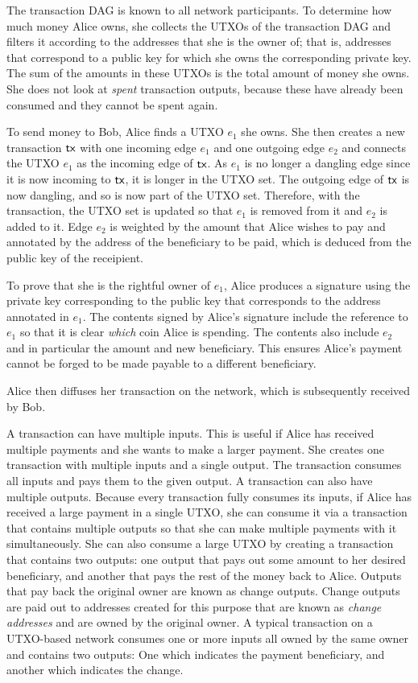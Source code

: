 The transaction DAG is known to all network participants. To determine how much
money Alice owns, she collects the UTXOs of the transaction DAG and filters it
according to the addresses that she is the owner of; that is, addresses that
correspond to a public key for which she owns the corresponding private key. The
sum of the amounts in these UTXOs is the total amount of money she owns. She
does not look at \emph{spent} transaction outputs, because these have already
been consumed and they cannot be spent again.

To send money to Bob, Alice finds a UTXO $e_1$ she owns. She then creates a new
transaction $\mathsf{tx}$ with one incoming edge $e_1$ and one outgoing edge $e_2$ and
connects the UTXO $e_1$ as the incoming edge of $\mathsf{tx}$. As $e_1$ is no longer
a dangling edge since it is now incoming to $\mathsf{tx}$, it is longer in the UTXO set.
The outgoing edge of $\mathsf{tx}$ is now dangling, and so is now part of the UTXO set.
Therefore, with the transaction, the UTXO set is updated so that $e_1$ is
removed from it and $e_2$ is added to it. Edge $e_2$ is weighted by the amount
that Alice wishes to pay and annotated by the address of the beneficiary to be
paid, which is deduced from the public key of the receipient.

To prove that she is the rightful owner of $e_1$, Alice produces a signature
using the private key corresponding to the public key that corresponds to the
address annotated in $e_1$. The contents signed by Alice's signature include the
reference to $e_1$ so that it is clear \emph{which} coin Alice is spending. The
contents also include $e_2$ and in particular the amount and new beneficiary.
This ensures Alice's payment cannot be forged to be made payable to a different
beneficiary.

Alice then diffuses her transaction on the network, which is subsequently
received by Bob.

A transaction can have multiple inputs. This is useful if Alice has received
multiple payments and she wants to make a larger payment. She creates one
transaction with multiple inputs and a single output. The transaction consumes
all inputs and pays them to the given output. A transaction can also have
multiple outputs. Because every transaction fully consumes its inputs, if Alice
has received a large payment in a single UTXO, she can consume it via a
transaction that contains multiple outputs so that she can make multiple
payments with it simultaneously. She can also consume a large UTXO by creating
a transaction that contains two outputs: one output that pays out some amount to
her desired beneficiary, and another that pays the rest of the money back to
Alice. Outputs that pay back the original owner are known as change outputs.
Change outputs are paid out to addresses created for this purpose that are known
as \emph{change addresses} and are owned by the original
owner. A typical transaction on a UTXO-based network consumes one or more inputs
all owned by the same owner and contains two outputs: One which indicates the
payment beneficiary, and another which indicates the change.

